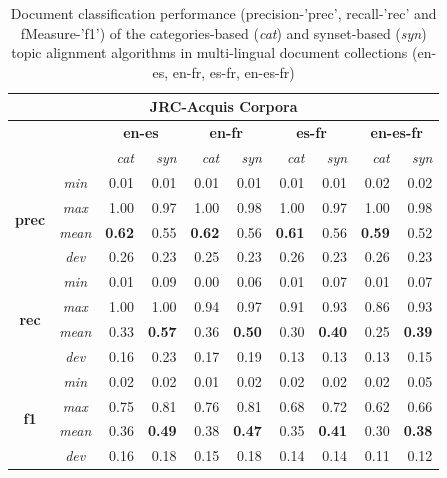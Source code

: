\begin{table}[ht]\centering
\begin{center}
\small
\begin{tabular}{cc|rr||rr||rr||rr}
    \hline
    \multicolumn{10}{c}{\textbf{JRC-Acquis Corpora}} \\
    \hline
    & & \multicolumn{2}{c}{\textbf{en-es}} &
      \multicolumn{2}{c}{\textbf{en-fr}} &
      \multicolumn{2}{c}{\textbf{es-fr}} &
      \multicolumn{2}{c}{\textbf{en-es-fr}} \\
    & & {\textit{cat}} & {\textit{syn}} & {\textit{cat}} & {\textit{syn}} & {\textit{cat}} & {\textit{syn}} & {\textit{cat}} & {\textit{syn}} \\
    \hline
    \multirow{4}{*}{\textbf{prec}} 
    &{\textit{min}}     &0.01 &0.01 &0.01 &0.01 &0.01 &0.01 &0.02 &0.02\\
    &{\textit{max}}     &1.00 &0.97 &1.00 &0.98 &1.00 &0.97 &1.00 &0.98\\
    &{\textit{mean}}    &\textbf{0.62} &0.55 &\textbf{0.62} &0.56 &\textbf{0.61} &0.56 &\textbf{0.59} &0.52\\
    &{\textit{dev}}     &0.26 &0.23 &0.25 &0.23 &0.26 &0.23 &0.26 &0.23\\
    \hline
    \multirow{4}{*}{\textbf{rec}} 
    &{\textit{min}}     &0.01 &0.09 &0.00 &0.06 &0.01 &0.07 &0.01 &0.07\\
    &{\textit{max}}     &1.00 &1.00 &0.94 &0.97 &0.91 &0.93 &0.86 &0.93\\
    &{\textit{mean}}    &0.33 &\textbf{0.57} &0.36 &\textbf{0.50} &0.30 &\textbf{0.40} &0.25 &\textbf{0.39}\\
    &{\textit{dev}}     &0.16 &0.23 &0.17 &0.19 &0.13 &0.13 &0.13 &0.15\\
    \hline
    \multirow{4}{*}{\textbf{f1}} 
    &{\textit{min}}     &0.02 &0.02 &0.01 &0.02 &0.02 &0.02 &0.02 &0.05\\
    &{\textit{max}}     &0.75 &0.81 &0.76 &0.81 &0.68 &0.72 &0.62 &0.66\\
    &{\textit{mean}}    &0.36 &\textbf{0.49} &0.38 &\textbf{0.47} &0.35 &\textbf{0.41} &0.30 &\textbf{0.38}\\
    &{\textit{dev}}     &0.16 &0.18 &0.15 &0.18 &0.14 &0.14 &0.11 &0.12\\
\end{tabular}
\end{center}
\caption{Document classification performance (precision-'prec', recall-'rec' and fMeasure-'f1') of the categories-based (\textit{cat}) and synset-based (\textit{syn}) topic alignment algorithms in multi-lingual document collections (en-es, en-fr, es-fr, en-es-fr)}
\label{tb:multi-class}
\end{table}

